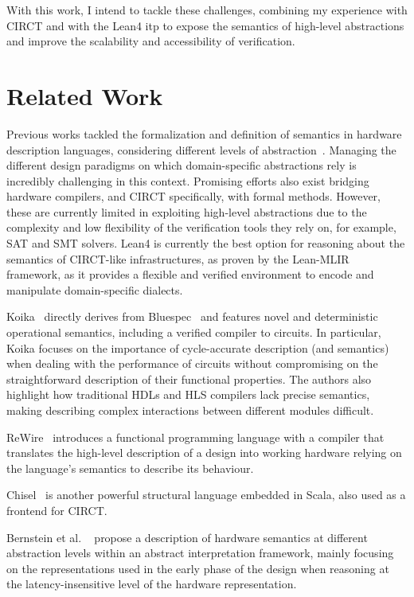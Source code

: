 \documentclass[sigconf,authorversion,nonacm, 11pt]{acmart}
\begin{document}
With this work, I intend to tackle these challenges, combining my experience with CIRCT and with the Lean4 \ac{itp} to expose the semantics of high-level abstractions and improve the scalability and accessibility of verification. 

\section{Related Work}

Previous works tackled the formalization and definition of semantics in hardware description languages, considering different levels of abstraction~\cite{melham1988abstraction}. 
Managing the different design paradigms on which domain-specific abstractions rely is incredibly challenging in this context. 
Promising efforts also exist bridging hardware compilers, and CIRCT specifically, with formal methods. 
However, these are currently limited in exploiting high-level abstractions due to the complexity and low flexibility of the verification tools they rely on, for example, SAT and SMT solvers.
Lean4 is currently the best option for reasoning about the semantics of CIRCT-like infrastructures, as proven by the Lean-MLIR~\cite{bhat2024verifying} framework, as it provides a flexible and verified environment to encode and manipulate domain-specific dialects.

Koika~\cite{bourgeat2020essence} directly derives from Bluespec~\cite{bluespec} and features novel and deterministic operational semantics, including a verified compiler to circuits. 
In particular, Koika focuses on the importance of cycle-accurate description (and semantics) when dealing with the performance of circuits without compromising on the straightforward description of their functional properties. 
The authors also highlight how traditional HDLs and HLS compilers lack precise semantics, making describing complex interactions between different modules difficult.

ReWire~\cite{procter2015semantics} introduces a functional programming language with a compiler that translates the high-level description of a design into working hardware relying on the language's semantics to describe its behaviour.

Chisel~\cite{bachrach2012chisel} is another powerful structural language embedded in Scala, also used as a frontend for CIRCT. 

Bernstein et al. ~\cite{bernstein2021semantics} propose a description of hardware semantics at different abstraction levels within an abstract interpretation framework, mainly focusing on the representations used in the early phase of the design when reasoning at the latency-insensitive level of the hardware representation.
\end{document}
